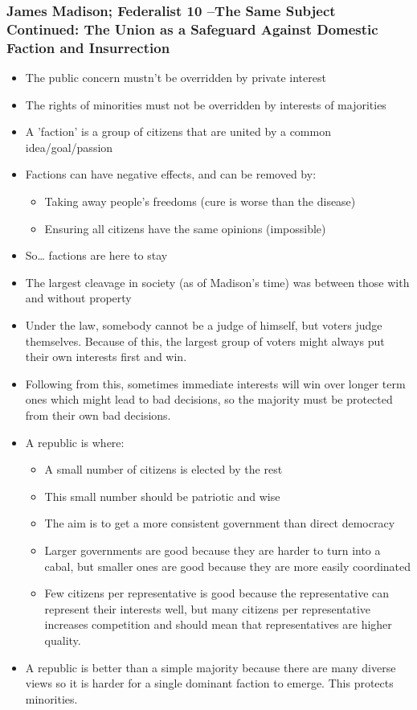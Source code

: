 \documentclass[11pt]{article}
\begin{document}
\subsubsection{James Madison; Federalist 10 –The Same Subject Continued: The Union as a Safeguard Against Domestic Faction and Insurrection}
\label{sec:org85bfdf4}
\begin{itemize}
\item The public concern mustn't be overridden by private interest
\item The rights of minorities must not be overridden by interests of majorities
\item A 'faction' is a group of citizens that are united by a common idea/goal/passion
\item Factions can have negative effects, and can be removed by:
\begin{itemize}
\item Taking away people's freedoms (cure is worse than the disease)
\item Ensuring all citizens have the same opinions (impossible)
\end{itemize}
\item So\ldots{} factions are here to stay
\item The largest cleavage in society (as of Madison's time) was between those with
and without property
\item Under the law, somebody cannot be a judge of himself, but voters judge
themselves. Because of this, the largest group of voters might always put
their own interests first and win.
\item Following from this, sometimes immediate interests will win over longer term
ones which might lead to bad decisions, so the majority must be protected from
their own bad decisions.
\item A republic is where:
\begin{itemize}
\item A small number of citizens is elected by the rest
\item This small number should be patriotic and wise
\item The aim is to get a more consistent government than direct democracy
\item Larger governments are good because they are harder to turn into a cabal,
but smaller ones are good because they are more easily coordinated
\item Few citizens per representative is good because the representative can
represent their interests well, but many citizens per representative
increases competition and should mean that representatives are higher
quality.
\end{itemize}
\item A republic is better than a simple majority because there are many diverse
views so it is harder for a single dominant faction to emerge. This protects
minorities.
\end{itemize}
\end{document}
